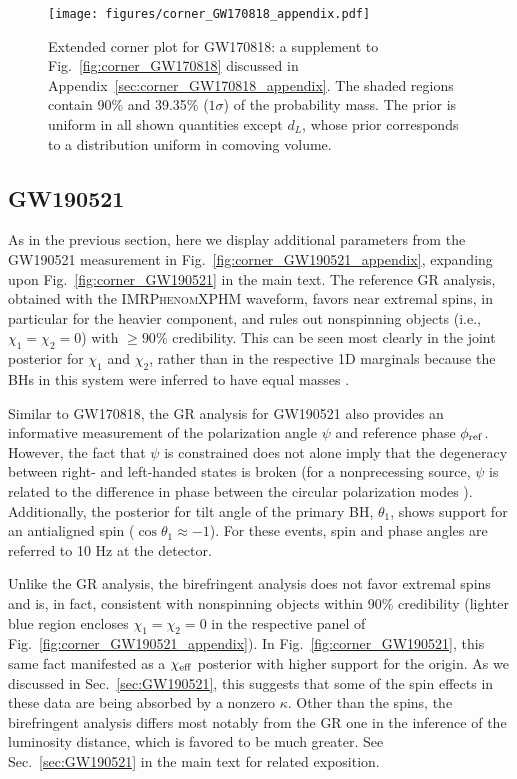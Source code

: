 \documentclass[aps,prd,twocolumn,superscriptaddress,preprintnumbers,nofootinbib]{revtex4-2}
\begin{document}
\begin{figure*}[h]
    \texttt{[image: figures/corner\_GW170818\_appendix.pdf]}
    \caption{
        Extended corner plot for GW170818: a supplement to Fig.~\ref{fig:corner_GW170818} discussed in Appendix~\ref{sec:corner_GW170818_appendix}.
        The shaded regions contain 90\% and 39.35\% ($1\sigma$) of the probability mass.
        The prior is uniform in all shown quantities except $d_L$, whose prior corresponds to a distribution uniform in comoving volume.
    }
    \label{fig:corner_GW170818_appendix}
\end{figure*}

\subsection{GW190521}
\label{sec:corner_GW190521_appendix}

As in the previous section, here we display additional parameters from the GW190521 measurement in Fig.~\ref{fig:corner_GW190521_appendix}, expanding upon Fig.~\ref{fig:corner_GW190521} in the main text.
The reference \ac{GR} analysis, obtained with the \textsc{IMRPhenomXPHM} waveform, favors near extremal spins, in particular for the heavier component, and rules out nonspinning objects (i.e., $\chi_1 = \chi_2 = 0$) with $\geq 90\%$ credibility.
This can be seen most clearly in the joint posterior for $\chi_1$ and $\chi_2$, rather than in the respective 1D marginals because the \acp{BH} in this system were inferred to have equal masses \cite{Biscoveanu:2020are}.

Similar to GW170818, the \ac{GR} analysis for GW190521 also provides an informative measurement of the polarization angle $\psi$ and reference phase $\phi_{\rm ref}$.
However, the fact that $\psi$ is constrained does not alone imply that the degeneracy between right- and left-handed states is broken (for a nonprecessing source, $\psi$ is related to the difference in phase between the circular polarization modes \cite{Isi:2022mbx}).
Additionally, the posterior for tilt angle of the primary \ac{BH}, $\theta_1$, shows support for an antialigned spin ($\cos\theta_1 \approx -1$).
For these events, spin and phase angles are referred to 10 Hz at the detector.

Unlike the \ac{GR} analysis, the birefringent analysis does not favor extremal spins and is, in fact, consistent with nonspinning objects within 90\% credibility (lighter blue region encloses $\chi_1 = \chi_2 = 0$ in the respective panel of Fig.~\ref{fig:corner_GW190521_appendix}).
In Fig.~\ref{fig:corner_GW190521}, this same fact manifested as a $\chi_{\rm eff}$ posterior with higher support for the origin.
As we discussed in Sec.~\ref{sec:GW190521}, this suggests that some of the spin effects in these data are being absorbed by a nonzero $\kappa$.
Other than the spins, the birefringent analysis differs most notably from the \ac{GR} one in the inference of the luminosity distance, which is favored to be much greater.
See Sec.~\ref{sec:GW190521} in the main text for related exposition.
\end{document}
